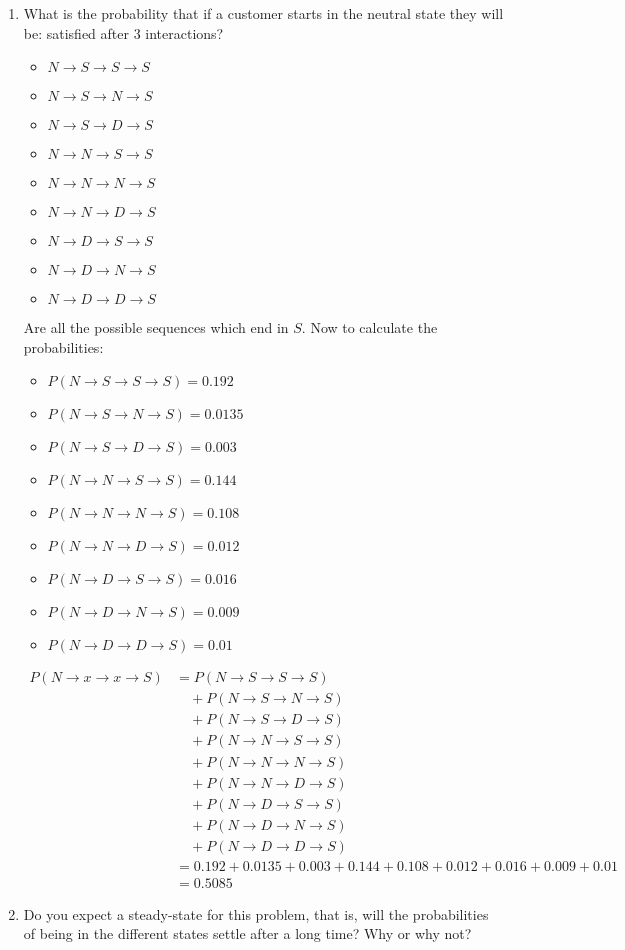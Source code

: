 \documentclass{article}
\begin{document}
\begin{enumerate}[label=(\alph*)]
    \item What is the probability that if a customer starts in the neutral state they will be: satisfied after 3 interactions?\begin{itemize}
        \item $N\to S\to S\to S$
        \item $N\to S\to N\to S$
        \item $N\to S\to D\to S$
        \item $N\to N\to S\to S$
        \item $N\to N\to N\to S$
        \item $N\to N\to D\to S$
        \item $N\to D\to S\to S$
        \item $N\to D\to N\to S$
        \item $N\to D\to D\to S$
    \end{itemize}
    Are all the possible sequences which end in $S$. Now to calculate the probabilities:\begin{itemize}
        \item $P(N\to S\to S\to S)=0.192$
        \item $P(N\to S\to N\to S)=0.0135$
        \item $P(N\to S\to D\to S)=0.003$
        \item $P(N\to N\to S\to S)=0.144$
        \item $P(N\to N\to N\to S)=0.108$
        \item $P(N\to N\to D\to S)=0.012$
        \item $P(N\to D\to S\to S)=0.016$
        \item $P(N\to D\to N\to S)=0.009$
        \item $P(N\to D\to D\to S)=0.01$
    \end{itemize}
    \begin{align*}
    P(N\to x\to x\to S) &= P(N\to S\to S\to S) \\
    &\quad + P(N\to S\to N\to S) \\
    &\quad + P(N\to S\to D\to S) \\
    &\quad + P(N\to N\to S\to S) \\
    &\quad + P(N\to N\to N\to S) \\
    &\quad + P(N\to N\to D\to S) \\
    &\quad + P(N\to D\to S\to S) \\
    &\quad + P(N\to D\to N\to S) \\
    &\quad + P(N\to D\to D\to S) \\
    &= 0.192 + 0.0135 + 0.003 + 0.144 + 0.108 + 0.012 + 0.016 + 0.009 + 0.01 \\
    &= 0.5085
    \end{align*}
\item Do you expect a steady-state for this problem, that is, will the probabilities of being in the different states settle after a long time? Why or why not?
\end{enumerate}
\end{document}
